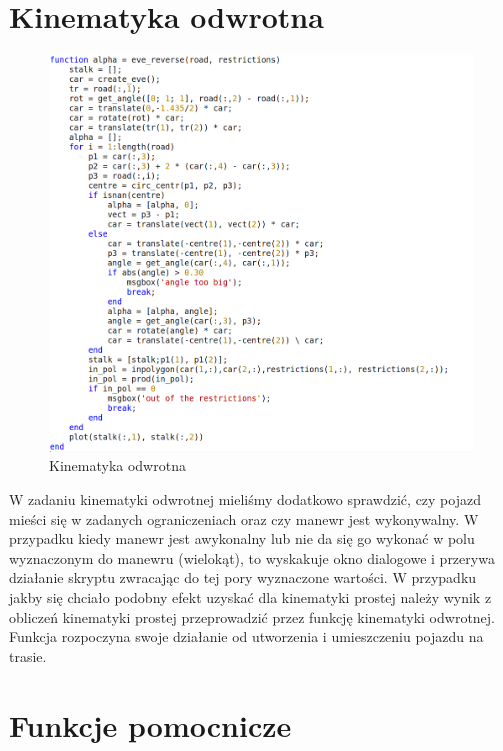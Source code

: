 \documentclass[a4paper, 12pt]{report}
\begin{document}
		\section{Kinematyka odwrotna}
			\begin{figure}[H]
				\centering
				\includegraphics[width = \textwidth]{./img/inv.png}
				\caption{Kinematyka odwrotna}
			\end{figure}
			W zadaniu kinematyki odwrotnej mieliśmy dodatkowo sprawdzić, czy pojazd mieści się w zadanych ograniczeniach oraz czy manewr jest wykonywalny. W przypadku kiedy manewr jest awykonalny lub nie da się go wykonać w polu wyznaczonym do manewru (wielokąt), to wyskakuje okno dialogowe i przerywa działanie skryptu zwracając do tej pory wyznaczone wartości.
			\newline
			\newline 
			W przypadku jakby się chciało podobny efekt uzyskać dla kinematyki prostej należy wynik z obliczeń kinematyki prostej przeprowadzić przez funkcję kinematyki odwrotnej.
			\newline 
			\newline
			Funkcja rozpoczyna swoje działanie od utworzenia i umieszczeniu pojazdu na trasie.
		\section{Funkcje pomocnicze}
\end{document}
